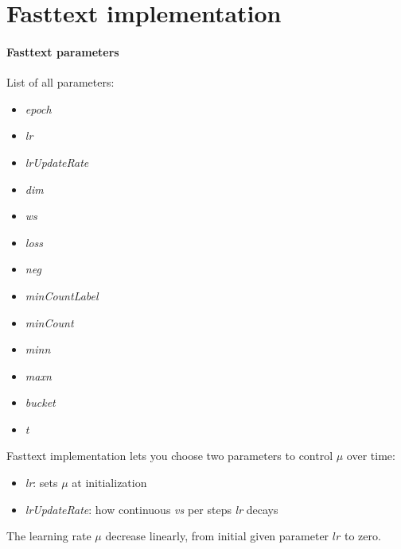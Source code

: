 \chapter{Fasttext implementation} 
\subsubsection{Fasttext parameters}

List of all parameters:
\begin{multicols}{3}
\begin{itemize}
	\item \textit{epoch}
	\item \textit{lr}
	\item \textit{lrUpdateRate}
	\item \textit{dim}
	\item \textit{ws}
	\item \textit{loss}
	\item \textit{neg}
	\item \textit{minCountLabel}
	\item \textit{minCount}
	\item \textit{minn}
	\item \textit{maxn}
	\item \textit{bucket}
	\item \textit{t}
\end{itemize}
\end{multicols}

Fasttext implementation lets you choose two parameters to control $\mu$ over time:
\begin{itemize}
	\item \textit{lr}: sets $\mu$ at initialization
	\item \textit{lrUpdateRate}: how continuous \textit{vs} per steps \textit{lr} decays
\end{itemize}

The learning rate $\mu$ decrease linearly, from initial given parameter $lr$ to zero.



